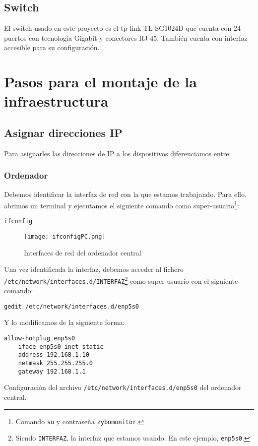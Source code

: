 \documentclass[12pt,letterpaper]{article}
\begin{document}
\subsection{Switch}
El switch usado en este proyecto es el tp-link TL-SG1024D que cuenta con 24 puertos con tecnología Gigabit y conectores RJ-45. También cuenta con interfaz accesible para su configuración.


\section{Pasos para el montaje de la infraestructura}
\subsection{Asignar direcciones IP}
Para asignarles las direcciones de IP a los dispositivos diferenciamos entre:
\subsubsection{Ordenador}
Debemos identificar la interfaz de red con la que estamos trabajando. Para ello, abrimos un terminal y ejecutamos el siguiente comando como super-usuario\footnote{Comando \texttt{su} y contraseña \texttt{zybomonitor}.}:
\begin{center}
	\texttt{ifconfig}
\end{center}
\newpage
\begin{figure}[h]
	\centering
	\texttt{[image: ifconfigPC.png]}
	\caption{Interfaces de red del ordenador central}
	\label{Interfaces de red del ordenador central}
\end{figure}

Una vez identificada la interfaz, debemos acceder al fichero\\ \texttt{/etc/network/interfaces.d/INTERFAZ}\footnote{Siendo \texttt{INTERFAZ}, la interfaz que estamos usando. En este ejemplo, \texttt{enp5s0}.} como super-usuario con el siguiente comando:
\begin{center}
	\texttt{gedit /etc/network/interfaces.d/enp5s0}
\end{center}
Y lo modificamos de la siguiente forma:
\begin{lstlisting}
allow-hotplug enp5s0
    iface enp5s0 inet static
    address 192.168.1.10
    netmask 255.255.255.0
    gateway 192.168.1.1
\end{lstlisting}
Configuración del archivo \texttt{/etc/network/interfaces.d/enp5s0} del ordenador central.
\end{document}
